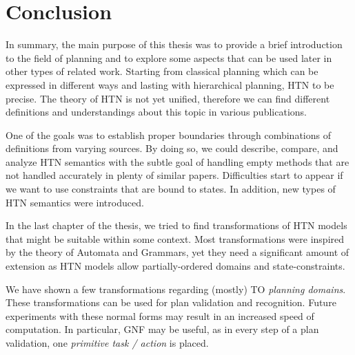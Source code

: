\chapter*{Conclusion}

\noindent
In summary, the main purpose of this thesis was to provide a brief introduction to the field of planning and to explore some aspects that can be used later in other types of related work. Starting from classical planning which can be expressed in different ways and lasting with hierarchical planning, HTN to be precise. The theory of HTN is not yet unified, therefore we can find different definitions and understandings about this topic in various publications. 

\medskip\noindent
One of the goals was to establish proper boundaries through combinations of definitions from varying sources. By doing so, we could describe, compare, and analyze HTN semantics with the subtle goal of handling empty methods that are not handled accurately in plenty of similar papers. Difficulties start to appear if we want to use constraints that are bound to states. In addition, new types of HTN semantics were introduced.

\medskip\noindent
In the last chapter of the thesis, we tried to find transformations of HTN models that might be suitable within some context. Most transformations were inspired by the theory of Automata and Grammars, yet they need a significant amount of extension as HTN models allow partially-ordered domains and state-constraints. 

\medskip\noindent
We have shown a few transformations regarding (mostly) TO \emph{planning domains}. These transformations can be used for plan validation and recognition. Future experiments with these normal forms may result in an increased speed of computation. In particular, GNF may be useful, as in every step of a plan validation, one \emph{primitive task / action} is placed.

